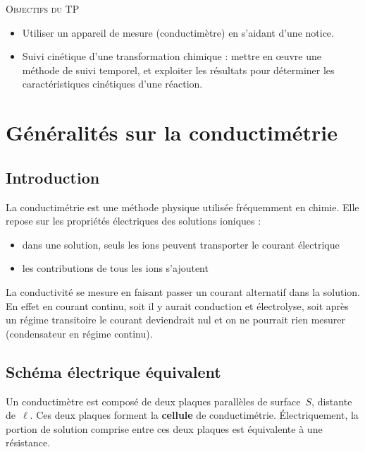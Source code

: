 \documentclass{tp}
\begin{document}
\noindent \textsc{Objectifs du TP}
\begin{itemize}
\item Utiliser un appareil de mesure (conductimètre) en s'aidant d'une notice.

\item Suivi cinétique d'une transformation chimique : mettre en \oe uvre une méthode de suivi temporel, et exploiter les résultats pour déterminer les caractéristiques cinétiques d'une réaction.
\end{itemize}


\section{Généralités sur la conductimétrie}

\subsection{Introduction}

\indent La conductimétrie est une méthode physique utilisée fréquemment en chimie. Elle repose sur les propriétés électriques des solutions ioniques :

\begin{itemize}
\item dans une solution, seuls les ions peuvent transporter le courant électrique
\item les contributions de tous les ions s'ajoutent
\end{itemize}


\indent La conductivité se mesure en faisant passer un courant alternatif dans la solution. En effet en courant continu, soit il y aurait conduction et électrolyse, soit après un régime transitoire le courant deviendrait nul et on ne pourrait rien mesurer (condensateur en régime continu).


\subsection{Schéma électrique équivalent}

\indent Un conductimètre est composé de deux plaques parallèles de surface~$S$, distante de~$\ell$. Ces deux plaques forment la \textbf{cellule} de conductimétrie. \'Electriquement, la portion de solution comprise entre ces deux plaques est équivalente à une résistance.

\vspace{-0.4cm}
\end{document}
